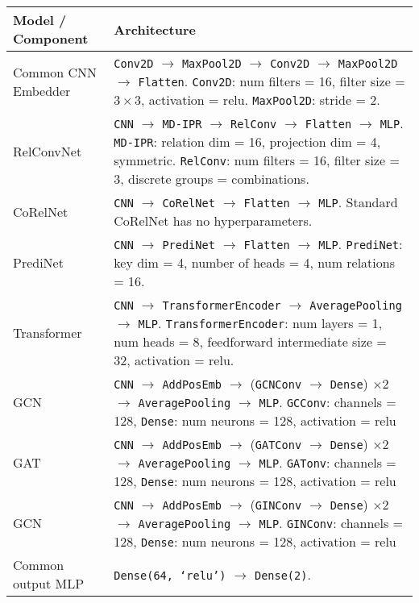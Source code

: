 \begin{tabular}{p{}p{}}
    \toprule
    Model / Component & Architecture \\ \midrule
    Common CNN \newline Embedder & \texttt{Conv2D} $\to$ \texttt{MaxPool2D} $\to$ \texttt{Conv2D} $\to$ \texttt{MaxPool2D} $\to$ \texttt{Flatten}. \newline
                        \texttt{Conv2D}: num filters = 16, filter size = $3 \times 3$, activation = relu. \newline
                        \texttt{MaxPool2D}: stride = 2. \\\hline
    RelConvNet        & \texttt{CNN} $\to$ \texttt{MD-IPR} $\to$ \texttt{RelConv} $\to$ \texttt{Flatten} $\to$ \texttt{MLP}. \newline
                        \texttt{MD-IPR}: relation dim = 16, projection dim = 4, symmetric. \newline
                        \texttt{RelConv}: num filters = 16, filter size = 3, discrete groups = combinations. \\\hline
    CoRelNet          & \texttt{CNN} $\to$ \texttt{CoRelNet} $\to$ \texttt{Flatten} $\to$ \texttt{MLP}. \newline
                        Standard CoRelNet has no hyperparameters. \\\hline
    PrediNet          & \texttt{CNN} $\to$ \texttt{PrediNet} $\to$ \texttt{Flatten} $\to$ \texttt{MLP}. \newline
                        \texttt{PrediNet}: key dim = 4, number of heads = 4, num relations = 16. \\\hline
    Transformer       & \texttt{CNN} $\to$ \texttt{TransformerEncoder} $\to$ \texttt{AveragePooling} $\to$ \texttt{MLP}. \newline
                    \texttt{TransformerEncoder}: num layers = 1, num heads = 8, feedforward intermediate size = 32, activation = relu. \\\hline
    GCN               &
        \texttt{CNN} $\to$ \texttt{AddPosEmb} $\to$ (\texttt{GCNConv} $\to$ \texttt{Dense}) $\times 2$ $\to$ \texttt{AveragePooling} $\to$ \texttt{MLP}. \newline
        \texttt{GCConv}: channels = 128, \texttt{Dense}: num neurons = 128, activation = relu \\\hline
    GAT               &
        \texttt{CNN} $\to$ \texttt{AddPosEmb} $\to$ (\texttt{GATConv} $\to$ \texttt{Dense}) $\times 2$ $\to$ \texttt{AveragePooling} $\to$ \texttt{MLP}. \newline
        \texttt{GATonv}: channels = 128, \texttt{Dense}: num neurons = 128, activation = relu \\\hline
    GCN               &
        \texttt{CNN} $\to$ \texttt{AddPosEmb} $\to$ (\texttt{GINConv} $\to$ \texttt{Dense}) $\times 2$ $\to$ \texttt{AveragePooling} $\to$ \texttt{MLP}. \newline
        \texttt{GINConv}: channels = 128, \texttt{Dense}: num neurons = 128, activation = relu \\\hline
                Common output MLP & \texttt{Dense(64, `relu')} $\to$ \texttt{Dense(2)}. \\ \bottomrule
\end{tabular}